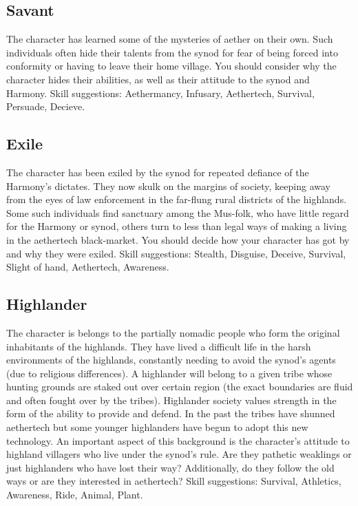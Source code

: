 \documentclass[a4paper,11pt,oneside]{book}
\begin{document}
\subsection{Savant}
The character has learned some of the mysteries of aether on their own. Such individuals often hide their talents from the synod for fear of being forced into conformity or having to leave their home village. You should consider why the character hides their abilities, as well as their attitude to the synod and Harmony. Skill suggestions: Aethermancy, Infusary, Aethertech, Survival, Persuade, Decieve. 

\subsection{Exile}
The character has been exiled by the synod for repeated defiance of the Harmony's dictates. They now skulk on the margins of society, keeping away from the eyes of law enforcement in the far-flung rural districts of the highlands. Some such individuals find sanctuary among the Mus-folk, who have little regard for the Harmony or synod, others turn to less than legal ways of making a living in the aethertech black-market. You should decide how your character has got by and why they were exiled. Skill suggestions: Stealth, Disguise, Deceive, Survival, Slight of hand, Aethertech, Awareness.  

\subsection{Highlander}
The character is belongs to the partially nomadic people who form the original inhabitants of the highlands. They have lived a difficult life in the harsh environments of the highlands, constantly needing to avoid the synod's agents (due to religious differences). A highlander will belong to a given tribe whose hunting grounds are staked out over certain region (the exact boundaries are fluid and often fought over by the tribes). Highlander society values strength in the form of the ability to provide and defend. In the past the tribes have shunned aethertech but some younger highlanders have begun to adopt this new technology. An important aspect of this background is the character's attitude to highland villagers who live under the synod's rule. Are they pathetic weaklings or just highlanders who have lost their way? Additionally, do they follow the old ways or are they interested in aethertech? Skill suggestions: Survival, Athletics, Awareness, Ride, Animal, Plant.  
\end{document}
